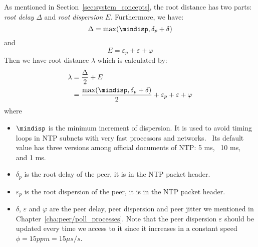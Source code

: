 As mentioned in Section~\ref{sec:system_concepts}, the root distance has two
parts: \emph{root delay} $\Delta$ and \emph{root dispersion} $E$. Furthermore, 
we have: 
\begin{equation}
    \Delta = \max(\mindisp, \delta_p + \delta)
    \label{eq:root_delay}
\end{equation}
and
\begin{equation}
    E = \varepsilon_p + \varepsilon + \varphi
    \label{eq:root_dispersion}
\end{equation}
Then we have root distance $\lambda$ which is calculated by:
\begin{align}
    \lambda & = \frac{\Delta}{2} + E\\
    & =\frac{\max(\mindisp, \delta_p + \delta)}{2} 
    + \varepsilon_p + \varepsilon + \varphi
    \label{eq:root_distance}
\end{align}
where 
\begin{itemize}
    \item $\mindisp$ is the minimum increment of dispersion.  It is used to
        avoid timing loops in NTP subnets with very fast processors and
        networks.~\cite{rfc5905} Its default value has three versions among
        official documents of NTP: 5 ms,~\cite{rfc5905} 10 ms,~\cite{rfc5905}
        and 1 ms.~\cite{performance_metrics}
    \item $\delta_p$ is the root delay of the peer, it is in the NTP packet
        header.
    \item $\varepsilon_p$ is the root dispersion of the peer, it is in the NTP
        packet header.
    \item $\delta$, $\varepsilon$ and $\varphi$  are the peer delay, peer
        dispersion and peer jitter we mentioned in
        Chapter~\ref{cha:peer/poll_processes}. Note that the peer dispersion
        $\varepsilon$ should be updated every time we access to it since it
        increases in a constant speed $\phi = 15 ppm = 15 \mu s/s$.
\end{itemize}

